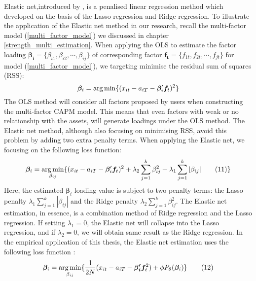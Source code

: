 Elastic net,introduced by ,  is a penalised linear regression method which developed on the basis of the Lasso regression \cite{Tibshirani1996} and Ridge regression.
To illustrate the application of the Elastic net method in our research, recall the multi-factor model (\ref{multi_factor_model}) we discussed in chapter \ref{strength_multi_estimation}.
When applying the OLS to estimate the factor loading $\bm{\beta_{i}} = \{ \beta_{i1}, \beta_{i2}, \cdots, \beta_{ij}   \}$ of corresponding factor $\bm{f_{t}} = \{ f_{1t}, f_{2t}, \cdots, f_{jt} \}$ for model (\ref{multi_factor_model}), we targeting minimise the residual sum of squares (RSS):
\[  \bm{\beta}_i =   \operatorname*{arg\,min}\{  (x_{it} - a_{iT} - \bm{\beta}_i^{\prime}\bm{f}_t )^2 \}    \]
The OLS method will consider all factors proposed by users when constructing the multi-factor CAPM model.
This means that even factors with weak or no relationship with the assets, will generate loadings under the OLS method.
The Elastic net method, although also focusing on minimising RSS, avoid this problem by adding two extra penalty terms.
When applying the Elastic net, we focusing on the following loss function:
\[   \bm{\beta}_{i}  = \operatorname*{arg\,min}_{\beta_{ij}}\{ (x_{it} - a_{iT} - \bm{\beta}_{i} ^{\prime}\bm{f}_{t})^2 + \lambda_2\sum_{j = 1}^k\beta_{ij}^2  + \lambda_1\sum_{j=1}^k|\beta_{ij}|  \label{ENcriterion} \tag{11}   \}    \]
Here, the estimated $\bm{\beta}_i$ loading value is subject to two penalty terms: the Lasso penalty $\lambda_1\sum_{j=1}^k|\beta_{ij}|$ and the Ridge penalty $\lambda_2\sum_{j = 1}^k\beta_{ij}^2$.
The Elastic net estimation, in essence, is a combination method of Ridge regression and the Lasso regression.
If setting $\lambda_1 = 0$, the Elastic net will collapse into the Lasso regression, and if $\lambda_2 = 0$, we will obtain same result as the Ridge regression.
In the empirical application of this thesis, the Elastic net estimation uses the following loss function \cite{Friedman2010}:
\[		\bm{\beta}_{i} = \operatorname*{arg\,min}_{\beta_{ij}}\{ \frac{1}{2N} (x_{it}-a_{iT} - \bm{\beta_{i}^{\prime}}\bm{f}_t ^2 ) +\phi P_{\theta}(\bm{\beta}_i)  \} \label{EN:empirical_formula}\tag{12} \]
